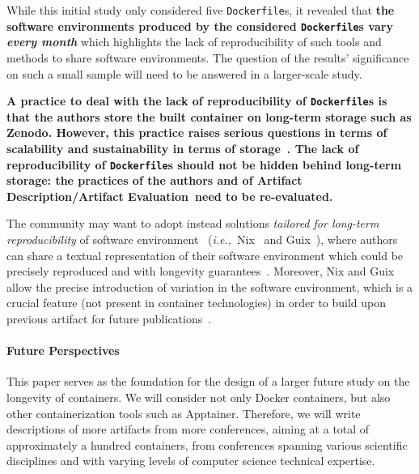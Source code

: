 \documentclass[sigconf,natbib=false]{acmart}
\newcommand{\ie}{\emph{i.e.,}}
\newcommand{\ad}{Artifact Description}
\newcommand{\aeval}{Artifact Evaluation}
\newcommand{\adae}{\ad/\aeval}
\newcommand{\df}{\texttt{Dockerfile}}
\begin{document}
While this initial study only considered five \df s, it revealed that \textbf{the software environments produced by the considered \df s vary \emph{every month}} which highlights the lack of reproducibility of such tools and methods to share software environments.
The question of the results' significance on such a small sample will need to be answered in a larger-scale study.

\textbf{
  A practice to deal with the lack of reproducibility of \df s is that the authors store the built container on long-term storage such as Zenodo.
  However, this practice raises serious questions in terms of scalability and sustainability in terms of storage~\cite{monroe2023preservation}.
  The lack of reproducibility of \df s should not be hidden behind long-term storage: the practices of the authors and of \adae\ need to be re-evaluated.
}

The community may want to adopt instead solutions \emph{tailored for long-term reproducibility} of software environment~\cite{malka2024reproducibility} (\ie\ Nix~\cite{dolstra_nix_2004} and Guix~\cite{courtes_functional_2013}), where authors can share a textual representation of their software environment which could be precisely reproduced and with longevity guarantees~\cite{courtes2024source}.
Moreover, Nix and Guix allow the precise introduction of variation in the software environment, which is a crucial feature (not present in container technologies) in order to build upon previous artifact for future publications~\cite{mercier2018considering}.

\paragraph{Future Perspectives}

This paper serves as the foundation for the design of a larger future study on the longevity of containers. 
We will consider not only Docker containers, but also other containerization tools such as Apptainer.
Therefore, we will write descriptions of more artifacts from more conferences, aiming at a total of approximately a hundred containers, from conferences spanning various scientific disciplines and with varying levels of computer science technical expertise.
\end{document}
